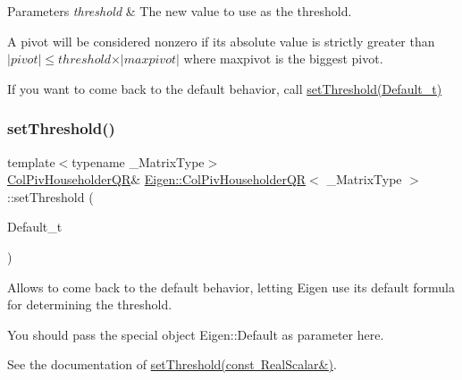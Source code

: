 \begin{DoxyParams}{Parameters}
{\em threshold} & The new value to use as the threshold.\\
\hline
\end{DoxyParams}
A pivot will be considered nonzero if its absolute value is strictly greater than $ \vert pivot \vert \leqslant threshold \times \vert maxpivot \vert $ where maxpivot is the biggest pivot.

If you want to come back to the default behavior, call \mbox{\hyperlink{class_eigen_1_1_col_piv_householder_q_r_a648df14c457ceceb09d933d06d3bdded}{set\+Threshold(\+Default\+\_\+t)}} \mbox{\label{class_eigen_1_1_col_piv_householder_q_r_a648df14c457ceceb09d933d06d3bdded}} 
\subsubsection{\texorpdfstring{setThreshold()}{setThreshold()}\hspace{0.1cm}{\footnotesize\ttfamily [2/2]}}
{\footnotesize\ttfamily template$<$typename \+\_\+\+Matrix\+Type$>$ \\
\mbox{\hyperlink{class_eigen_1_1_col_piv_householder_q_r}{Col\+Piv\+Householder\+QR}}\& \mbox{\hyperlink{class_eigen_1_1_col_piv_householder_q_r}{Eigen\+::\+Col\+Piv\+Householder\+QR}}$<$ \+\_\+\+Matrix\+Type $>$\+::set\+Threshold (\begin{DoxyParamCaption}\item[{Default\+\_\+t}]{ }\end{DoxyParamCaption})\hspace{0.3cm}{\ttfamily [inline]}}

Allows to come back to the default behavior, letting Eigen use its default formula for determining the threshold.

You should pass the special object Eigen\+::\+Default as parameter here. 
\begin{DoxyCode}{0}
\end{DoxyCode}


See the documentation of \mbox{\hyperlink{class_eigen_1_1_col_piv_householder_q_r_ae712cdc9f0e521cfc8061bee58ff55ee}{set\+Threshold(const Real\+Scalar\&)}}. \mbox{\label{class_eigen_1_1_col_piv_householder_q_r_aaa9c4af89930ab3bb7612ed9ae33d3f5}} 

